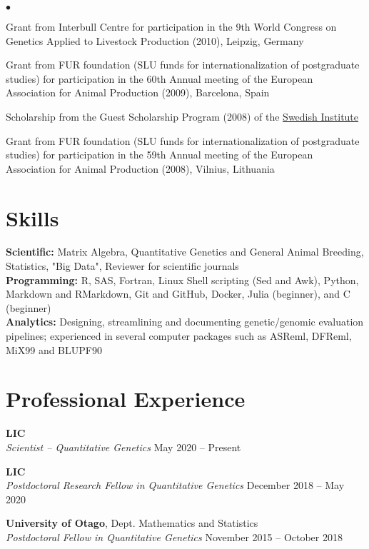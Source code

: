 \documentclass[margin,line]{res}
\newenvironment{list2}{
  \begin{list}{$\bullet$}{%
      \setlength{\itemsep}{0in}
      \setlength{\parsep}{0in} \setlength{\parskip}{0in}
      \setlength{\topsep}{0in} \setlength{\partopsep}{0in}
      \setlength{\leftmargin}{0.2in}}}{\end{list}}
\begin{document}
\begin{resume}
\begin{list2}
\item Grant from Interbull Centre for participation in the 9th World Congress on Genetics Applied to Livestock Production (2010), Leipzig, Germany
\item Grant from FUR foundation (SLU funds for internationalization of postgraduate studies) for participation in the 60th Annual meeting of the European Association for Animal Production (2009), Barcelona, Spain
\item Scholarship from the Guest Scholarship Program (2008) of the \href{https://si.se/en}{Swedish Institute}
\item Grant from FUR foundation (SLU funds for internationalization of postgraduate studies) for participation in the 59th Annual meeting of the European Association for Animal Production (2008), Vilnius, Lithuania
\end{list2}
\section{\sc Skills}

{\bf Scientific:} Matrix Algebra, Quantitative Genetics and General Animal Breeding, Statistics, "Big Data", Reviewer for scientific journals \\
{\bf Programming:} R, SAS, Fortran, Linux Shell scripting (Sed and Awk), Python, Markdown and RMarkdown, Git and GitHub, Docker, Julia (beginner), and C (beginner) \\
{\bf Analytics:} Designing, streamlining and documenting genetic/genomic evaluation pipelines; experienced in several computer packages such as ASReml, DFReml, MiX99 and BLUPF90
\section{\sc Professional Experience}

{\bf LIC} \\
{\em Scientist -- Quantitative Genetics} \hfill{May 2020 -- Present}

{\bf LIC} \\
{\em Postdoctoral Research Fellow in Quantitative Genetics} \hfill{December 2018 -- May 2020}

{\bf University of Otago}, Dept. Mathematics and Statistics \\
{\em Postdoctoral Fellow in Quantitative Genetics} \hfill{November 2015 -- October 2018}


\end{resume}
\end{document}
